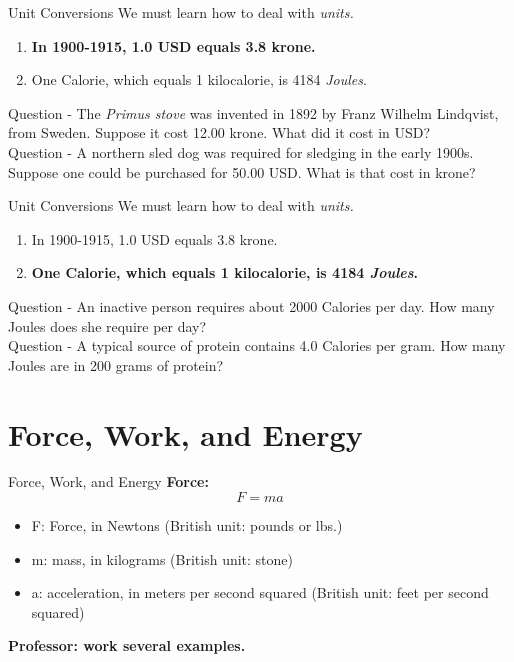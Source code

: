 \documentclass{beamer}
\begin{document}
\begin{frame}{Unit Conversions}
\small
We must learn how to deal with \textit{units.}
\begin{enumerate}
\item \textbf{In 1900-1915, 1.0 USD equals 3.8 krone.}
\item One Calorie, which equals 1 kilocalorie, is 4184 \textit{Joules}.
\end{enumerate}
Question - The \textit{Primus stove} was invented in 1892 by Franz Wilhelm Lindqvist, from Sweden.  Suppose it cost 12.00 krone.  What did it cost in USD? \\ \vspace{0.5cm}
Question - A northern sled dog was required for sledging in the early 1900s.  Suppose one could be purchased for 50.00 USD.  What is that cost in krone? \\
\end{frame}

\begin{frame}{Unit Conversions}
\small
We must learn how to deal with \textit{units.}
\begin{enumerate}
\item In 1900-1915, 1.0 USD equals 3.8 krone.
\item \textbf{One Calorie, which equals 1 kilocalorie, is 4184 \textit{Joules}.}
\end{enumerate}
Question - An inactive person requires about 2000 Calories per day.  How many Joules does she require per day?  \\ \vspace{0.5cm}
Question - A typical source of protein contains 4.0 Calories per gram.  How many Joules are in 200 grams of protein? \\
\end{frame}

\section{Force, Work, and Energy}

\begin{frame}{Force, Work, and Energy}
\textbf{Force:} 
\begin{equation}
F = m a
\end{equation}
\begin{itemize}
\item F: Force, in Newtons (British unit: pounds or lbs.)
\item m: mass, in kilograms (British unit: stone)
\item a: acceleration, in meters per second squared (British unit: feet per second squared)
\end{itemize}
\textbf{Professor: work several examples.}
\end{frame}
\end{document}
